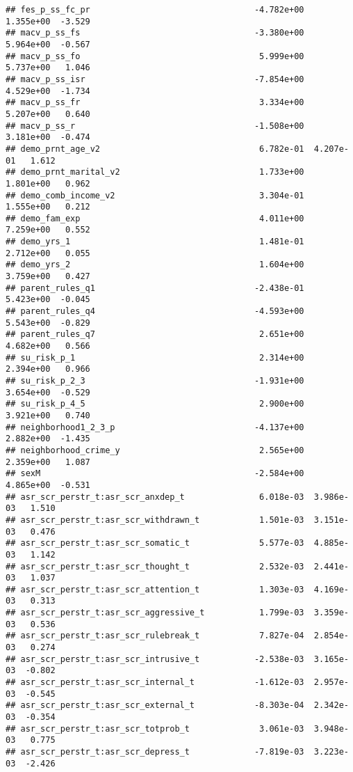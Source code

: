 \documentclass[
]{article}
\begin{document}
\begin{verbatim}
## fes_p_ss_fc_pr                                 -4.782e+00  1.355e+00  -3.529
## macv_p_ss_fs                                   -3.380e+00  5.964e+00  -0.567
## macv_p_ss_fo                                    5.999e+00  5.737e+00   1.046
## macv_p_ss_isr                                  -7.854e+00  4.529e+00  -1.734
## macv_p_ss_fr                                    3.334e+00  5.207e+00   0.640
## macv_p_ss_r                                    -1.508e+00  3.181e+00  -0.474
## demo_prnt_age_v2                                6.782e-01  4.207e-01   1.612
## demo_prnt_marital_v2                            1.733e+00  1.801e+00   0.962
## demo_comb_income_v2                             3.304e-01  1.555e+00   0.212
## demo_fam_exp                                    4.011e+00  7.259e+00   0.552
## demo_yrs_1                                      1.481e-01  2.712e+00   0.055
## demo_yrs_2                                      1.604e+00  3.759e+00   0.427
## parent_rules_q1                                -2.438e-01  5.423e+00  -0.045
## parent_rules_q4                                -4.593e+00  5.543e+00  -0.829
## parent_rules_q7                                 2.651e+00  4.682e+00   0.566
## su_risk_p_1                                     2.314e+00  2.394e+00   0.966
## su_risk_p_2_3                                  -1.931e+00  3.654e+00  -0.529
## su_risk_p_4_5                                   2.900e+00  3.921e+00   0.740
## neighborhood1_2_3_p                            -4.137e+00  2.882e+00  -1.435
## neighborhood_crime_y                            2.565e+00  2.359e+00   1.087
## sexM                                           -2.584e+00  4.865e+00  -0.531
## asr_scr_perstr_t:asr_scr_anxdep_t               6.018e-03  3.986e-03   1.510
## asr_scr_perstr_t:asr_scr_withdrawn_t            1.501e-03  3.151e-03   0.476
## asr_scr_perstr_t:asr_scr_somatic_t              5.577e-03  4.885e-03   1.142
## asr_scr_perstr_t:asr_scr_thought_t              2.532e-03  2.441e-03   1.037
## asr_scr_perstr_t:asr_scr_attention_t            1.303e-03  4.169e-03   0.313
## asr_scr_perstr_t:asr_scr_aggressive_t           1.799e-03  3.359e-03   0.536
## asr_scr_perstr_t:asr_scr_rulebreak_t            7.827e-04  2.854e-03   0.274
## asr_scr_perstr_t:asr_scr_intrusive_t           -2.538e-03  3.165e-03  -0.802
## asr_scr_perstr_t:asr_scr_internal_t            -1.612e-03  2.957e-03  -0.545
## asr_scr_perstr_t:asr_scr_external_t            -8.303e-04  2.342e-03  -0.354
## asr_scr_perstr_t:asr_scr_totprob_t              3.061e-03  3.948e-03   0.775
## asr_scr_perstr_t:asr_scr_depress_t             -7.819e-03  3.223e-03  -2.426

\end{verbatim}
\end{document}
